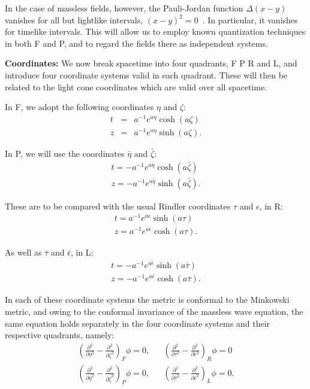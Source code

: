 \documentclass[aps,prl,showpacs,12pt]{revtex4}
\begin{document}
In the case of massless fields, however, the Pauli-Jordan function $\Delta (x - y)$ vanishes for all but lightlike intervals, $(x - y)^2 = 0$~\cite{heitler1}.  In particular, it vanishes for timelike intervals.  This will allow us to employ known quantization techniques in both F and P, and to regard the fields there as independent systems.

\textbf{Coordinates:} We now break spacetime into four quadrants, F P R and L, and introduce four coordinate systems valid in each quadrant.  These will then be related to the light cone coordinates which are valid over all spacetime.

In F, we adopt the following coordinates $\eta$ and $\zeta$:
\begin{eqnarray*}
 t  &=&  a^{-1} e^{a \eta} \cosh(a \zeta) \\
 z  &=&  a^{-1} e^{a \eta} \sinh(a \zeta) .
\end{eqnarray*}

In P, we will use the coordinates $\bar{\eta}$ and $\bar{\zeta}$:
\begin{eqnarray*}
 t = - a^{-1} e^{a \bar{\eta}} \cosh(a \bar{\zeta}) \\
 z = - a^{-1} e^{a \bar{\eta}} \sinh( a \bar{\zeta}).
\end{eqnarray*}

These are to be compared with the usual Rindler coordinates $\tau$ and $\epsilon$, in R:
\begin{eqnarray*}
t  =  a^{-1} e^{a \epsilon} \sinh(a \tau) \\
z  =  a^{-1} e^{a \epsilon} \cosh(a \tau).
\end{eqnarray*}

As well as $\bar{\tau}$ and $\bar{\epsilon}$, in L:
\begin{eqnarray*}
t  =  -a^{-1} e^{a \bar{\epsilon}} \sinh(a \bar{\tau}) \\
z  =  -a^{-1} e^{a \bar{\epsilon}} \cosh(a \bar{\tau}).
\end{eqnarray*}


In each of these coordinate systems the metric is conformal to the Minkowski metric, and owing to the conformal invariance of the massless wave equation, the same equation holds separately in the four coordinate systems and their respective quadrants, namely:
\begin{eqnarray*}
\left( \frac{\partial^2}{\partial \eta^2} - \frac{\partial^2}{\partial \zeta^2}\right)_{F} \phi = 0, && \left( \frac{\partial^2}{\partial \tau^2} - \frac{\partial^2}{\partial \epsilon^2}\right)_{R} \phi = 0 \\
\left( \frac{\partial^2}{\partial \bar{\eta}^2} - \frac{\partial^2}{\partial \bar{\zeta}^2}\right)_{P} \phi = 0, && \left( \frac{\partial^2}{\partial \bar{\tau}^2} - \frac{\partial^2}{\partial \bar{\epsilon}^2}\right)_{L} \phi = 0.
\end{eqnarray*}
\end{document}
